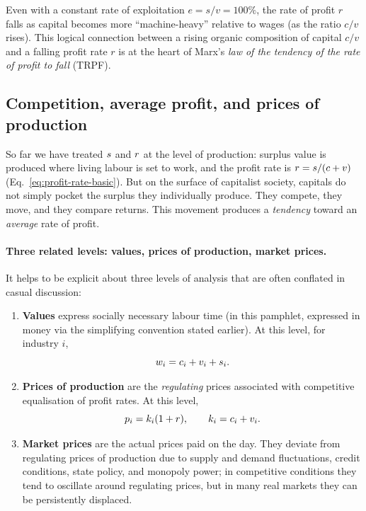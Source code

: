 Even with a constant rate of exploitation $e = s/v = 100\%$, the rate of profit $r$ falls as capital becomes more “machine-heavy” relative to wages (as the ratio $c/v$ rises). This logical connection between a rising organic composition of capital $c/v$ and a falling profit rate $r$ is at the heart of Marx’s \emph{law of the tendency of the rate of profit to fall} (TRPF).\cite{Roberts2015,Shaikh2016}

\subsection{Competition, average profit, and prices of production}
\label{sec:prices-production}

So far we have treated $s$ and $r$ at the level of production:
surplus value is produced where living labour is set to work, and the profit rate
is $r = s/(c+v)$ (Eq.~\eqref{eq:profit-rate-basic}).
But on the surface of capitalist society, capitals do not simply pocket the surplus
they individually produce. They compete, they move, and they compare returns.
This movement produces a \emph{tendency} toward an \emph{average} rate of profit.

\paragraph{Three related levels: values, prices of production, market prices.}
It helps to be explicit about three levels of analysis that are often conflated in casual discussion:

\begin{enumerate}[leftmargin=1.5em]
  \item \textbf{Values} express socially necessary labour time (in this pamphlet, expressed in money via the simplifying convention stated earlier). At this level, for industry $i$,
  \[
    w_i = c_i + v_i + s_i.
  \]
  \item \textbf{Prices of production} are the \emph{regulating} prices associated with competitive equalisation of profit rates. At this level,
  \[
    p_i = k_i(1+r), \qquad k_i = c_i + v_i.
  \]
  \item \textbf{Market prices} are the actual prices paid on the day. They deviate from regulating prices of production due to supply and demand fluctuations, credit conditions, state policy, and monopoly power; in competitive conditions they tend to oscillate around regulating prices, but in many real markets they can be persistently displaced.
\end{enumerate}


